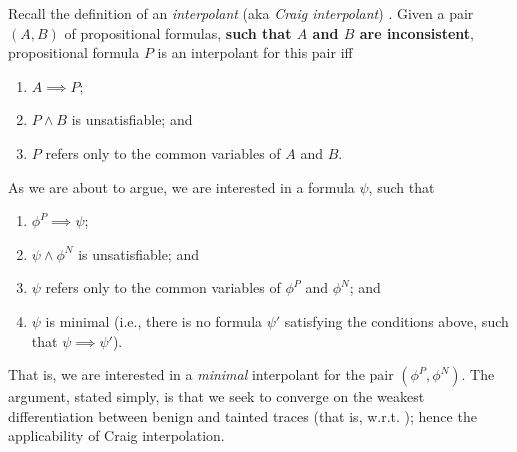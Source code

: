 \documentclass[]{article}
\newcommand{\ignore}[1]{}
\newcommand{\lsyn}{[\![}
\newcommand{\rsyn}{]\!]}
\newtheorem{defn}{Definition}
\newcommand{\jose}[1]{{\textbf{\color{blue} #1}}}
\begin{document}
\newcommand{\asgn}{\textnormal{$\mathbb{A}$}}
\newcommand{\asgnL}{\textnormal{$\mathbb{A}_L$}}
\newcommand{\asgnLP}{\textnormal{$\mathbb{A}_{L'}$}}

Recall the definition of an \emph{interpolant} (aka \emph{Craig interpolant}) \cite{XXX}. Given a pair $(A,B)$ of propositional formulas, \jose{such that $A$ and $B$ are inconsistent}, propositional formula $P$ is an interpolant for this pair iff
\begin{enumerate}
	\item $A \implies P$;
	\item $P \wedge B$ is unsatisfiable; and
	\item $P$ refers only to the common variables of $A$ and $B$.
\end{enumerate}

As we are about to argue, we are interested in a formula $\psi$, such that
\begin{enumerate}
	\item $\phi^P \implies \psi$;
	\item $\psi \wedge \phi^N$ is unsatisfiable; and
	\item $\psi$ refers only to the common variables of $\phi^P$ and $\phi^N$; and
	\item $\psi$ is minimal (i.e., there is no formula $\psi'$ satisfying the conditions above, such that $\psi \implies \psi'$).
\end{enumerate}
That is, we are interested in a \emph{minimal} interpolant for the pair $(\phi^P,\phi^N)$.
The argument, stated simply, is that we seek to converge on the weakest differentiation between benign and tainted traces (that is, w.r.t. \query{\xvar}{\yvar}); hence the applicability of Craig interpolation.

\ignore{
\begin{defn}[The optimality order] Let $\psi$ be a formula ranging over set $L$ of atoms, and $\psi'$ another formula. We define partial order $\prec$, such that $\psi' \prec \psi$ if the following three conditions hold:
	\item $\psi'$ ranges over set $L' \subseteq L$ of atoms.
	\item Any assignment \asgnLP\ to the literals $L'$ such that $\lsyn \psi' \rsyn_{\asgnLP}$ can be completed into an assignment \asgnL\ to the literals $L$ such that $\lsyn \psi \rsyn_{\asgnL}$.
	\item For any assignment \asgnLP\ to the literals $L'$ such that $\neg \lsyn \psi' \rsyn_{\asgnLP}$, there is no assignment \asgnL\ to the literals $L$ that is a completion of \asgnLP\ such that $\lsyn \psi \rsyn_{\asgnL}$.
\end{defn}
}
\end{document}
